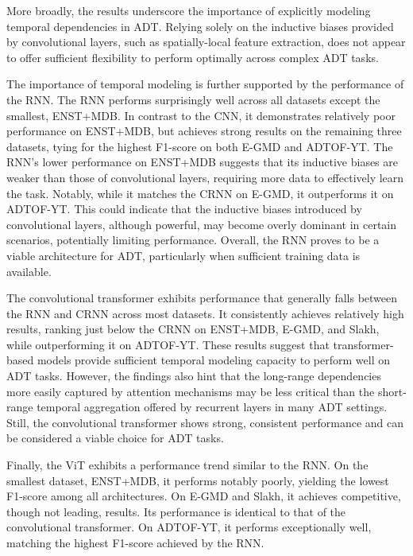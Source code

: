 More broadly, the results underscore the importance of explicitly modeling temporal dependencies in \gls{ADT}. Relying solely on the inductive biases provided by convolutional layers, such as spatially-local feature extraction, does not appear to offer sufficient flexibility to perform optimally across complex \gls{ADT} tasks.

The importance of temporal modeling is further supported by the performance of the \acrlong{RNN}. The \gls{RNN} performs surprisingly well across all datasets except the smallest, ENST+MDB. In contrast to the \gls{CNN}, it demonstrates relatively poor performance on ENST+MDB, but achieves strong results on the remaining three datasets, tying for the highest F1-score on both E-GMD and ADTOF-YT. The \gls{RNN}'s lower performance on ENST+MDB suggests that its inductive biases are weaker than those of convolutional layers, requiring more data to effectively learn the task. Notably, while it matches the \gls{CRNN} on E-GMD, it outperforms it on ADTOF-YT. This could indicate that the inductive biases introduced by convolutional layers, although powerful, may become overly dominant in certain scenarios, potentially limiting performance. Overall, the \gls{RNN} proves to be a viable architecture for \gls{ADT}, particularly when sufficient training data is available.

The convolutional transformer exhibits performance that generally falls between the \gls{RNN} and \gls{CRNN} across most datasets. It consistently achieves relatively high results, ranking just below the \gls{CRNN} on ENST+MDB, E-GMD, and Slakh, while outperforming it on ADTOF-YT. These results suggest that transformer-based models provide sufficient temporal modeling capacity to perform well on \gls{ADT} tasks. However, the findings also hint that the long-range dependencies more easily captured by attention mechanisms may be less critical than the short-range temporal aggregation offered by recurrent layers in many \gls{ADT} settings. Still, the convolutional transformer shows strong, consistent performance and can be considered a viable choice for \gls{ADT} tasks.

Finally, the \acrfull{ViT} exhibits a performance trend similar to the \gls{RNN}. On the smallest dataset, ENST+MDB, it performs notably poorly, yielding the lowest F1-score among all architectures. On E-GMD and Slakh, it achieves competitive, though not leading, results. Its performance is identical to that of the convolutional transformer. On ADTOF-YT, it performs exceptionally well, matching the highest F1-score achieved by the \gls{RNN}. 

